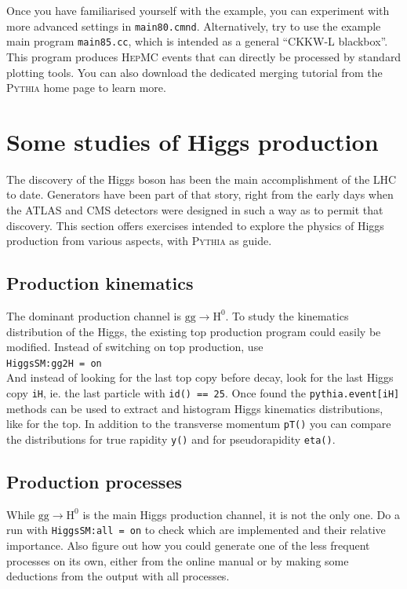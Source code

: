 \documentclass[12pt,a4paper]{article}
\newcommand{\g}{{\mathrm g}}
\renewcommand{\H}{{\mathrm H}}
\begin{document}
Once you have familiarised yourself with the example, you can experiment
with more advanced settings in \texttt{main80.cmnd}. Alternatively, 
try to use the example main program \texttt{main85.cc}, which is intended 
as a general ``{\smaller CKKW-L} blackbox''. This program produces 
\textsc{HepMC} events that can directly be processed by standard plotting 
tools. You can also download the dedicated merging tutorial from the
\textsc{Pythia} home page to learn more.

\section{Some studies of Higgs production}

The discovery of the Higgs boson has been the main accomplishment
of the LHC to date. Generators have been part of that story, right from 
the early days when the ATLAS and CMS detectors were designed in such a
way as to permit that discovery. This section offers exercises 
intended to explore the physics of Higgs production from various aspects,
with \textsc{Pythia} as guide.

\subsection{Production kinematics}

The dominant production channel is $\g\g\to\H^0$. To study the 
kinematics distribution of the Higgs, the existing top production
program could easily be modified. Instead of switching on top
production, use\\  
\hspace*{10mm}\texttt{HiggsSM:gg2H = on}\\
And instead of looking for the last top copy before decay, look
for the last Higgs copy \texttt{iH}, ie. the last particle with 
\texttt{id() == 25}. Once found the \texttt{pythia.event[iH]}
methods can be used to extract and histogram Higgs kinematics 
distributions, like for the top. In addition to the transverse
momentum \texttt{pT()} you can compare the distributions for 
true rapidity \texttt{y()} and for pseudorapidity \texttt{eta()}.

\subsection{Production processes}

While $\g\g \to \H^0$ is the main Higgs production channel,
it is not the only one. Do a run with \texttt{HiggsSM:all = on} 
to check which are implemented and their relative importance.
Also figure out how you could generate one of the less frequent 
processes on its own, either from the online manual or by making 
some deductions from the output with all processes.
\end{document}
